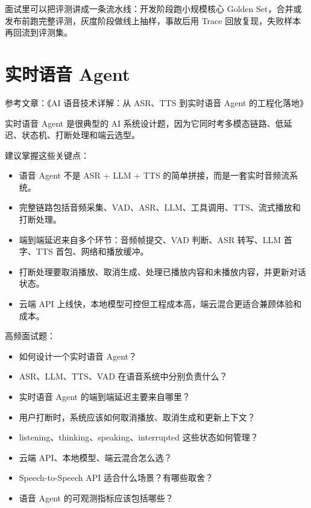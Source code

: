 \documentclass[10pt,a4paper]{ctexart}
\begin{document}
面试里可以把评测讲成一条流水线：开发阶段跑小规模核心 Golden Set，合并或发布前跑完整评测，灰度阶段做线上抽样，事故后用 Trace 回放复现，失败样本再回流到评测集。



\section{实时语音 Agent}


参考文章：《AI 语音技术详解：从 ASR、TTS 到实时语音 Agent 的工程化落地》



实时语音 Agent 是很典型的 AI 系统设计题，因为它同时考多模态链路、低延迟、状态机、打断处理和端云选型。



建议掌握这些关键点：


\begin{itemize}[itemsep=2pt, topsep=4pt]
  \item 语音 Agent 不是 ASR + LLM + TTS 的简单拼接，而是一套实时音频流系统。
  \item 完整链路包括音频采集、VAD、ASR、LLM、工具调用、TTS、流式播放和打断处理。
  \item 端到端延迟来自多个环节：音频帧提交、VAD 判断、ASR 转写、LLM 首字、TTS 首包、网络和播放缓冲。
  \item 打断处理要取消播放、取消生成、处理已播放内容和未播放内容，并更新对话状态。
  \item 云端 API 上线快，本地模型可控但工程成本高，端云混合更适合兼顾体验和成本。
\end{itemize}


高频面试题：


\begin{itemize}[itemsep=2pt, topsep=4pt]
  \item 如何设计一个实时语音 Agent？
  \item ASR、LLM、TTS、VAD 在语音系统中分别负责什么？
  \item 实时语音 Agent 的端到端延迟主要来自哪里？
  \item 用户打断时，系统应该如何取消播放、取消生成和更新上下文？
  \item listening、thinking、speaking、interrupted 这些状态如何管理？
  \item 云端 API、本地模型、端云混合怎么选？
  \item Speech-to-Speech API 适合什么场景？有哪些取舍？
  \item 语音 Agent 的可观测指标应该包括哪些？
\end{itemize}
\end{document}
